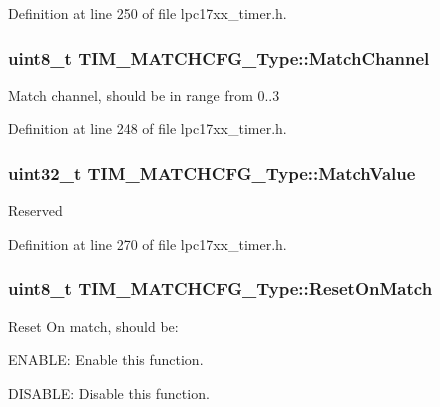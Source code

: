 \-Definition at line 250 of file lpc17xx\-\_\-timer.\-h.

\hypertarget{struct_t_i_m___m_a_t_c_h_c_f_g___type_a3d7414f4ad112270c774d2ec42c97f04}{
\subsubsection[{\-Match\-Channel}]{\setlength{\rightskip}{0pt plus 5cm}uint8\-\_\-t {\bf \-T\-I\-M\-\_\-\-M\-A\-T\-C\-H\-C\-F\-G\-\_\-\-Type\-::\-Match\-Channel}}}\label{struct_t_i_m___m_a_t_c_h_c_f_g___type_a3d7414f4ad112270c774d2ec42c97f04}
\-Match channel, should be in range from 0..3 

\-Definition at line 248 of file lpc17xx\-\_\-timer.\-h.

\hypertarget{struct_t_i_m___m_a_t_c_h_c_f_g___type_a354006a387d617c7cbde6e210cc54e48}{
\subsubsection[{\-Match\-Value}]{\setlength{\rightskip}{0pt plus 5cm}uint32\-\_\-t {\bf \-T\-I\-M\-\_\-\-M\-A\-T\-C\-H\-C\-F\-G\-\_\-\-Type\-::\-Match\-Value}}}\label{struct_t_i_m___m_a_t_c_h_c_f_g___type_a354006a387d617c7cbde6e210cc54e48}
\-Reserved 

\-Definition at line 270 of file lpc17xx\-\_\-timer.\-h.

\hypertarget{struct_t_i_m___m_a_t_c_h_c_f_g___type_a2cc6f3d39fcdf6e8d206a644fdb725b0}{
\subsubsection[{\-Reset\-On\-Match}]{\setlength{\rightskip}{0pt plus 5cm}uint8\-\_\-t {\bf \-T\-I\-M\-\_\-\-M\-A\-T\-C\-H\-C\-F\-G\-\_\-\-Type\-::\-Reset\-On\-Match}}}\label{struct_t_i_m___m_a_t_c_h_c_f_g___type_a2cc6f3d39fcdf6e8d206a644fdb725b0}
\-Reset \-On match, should be\-:
\begin{DoxyItemize}
\item \-E\-N\-A\-B\-L\-E\-: \-Enable this function.
\item \-D\-I\-S\-A\-B\-L\-E\-: \-Disable this function. 
\end{DoxyItemize}

